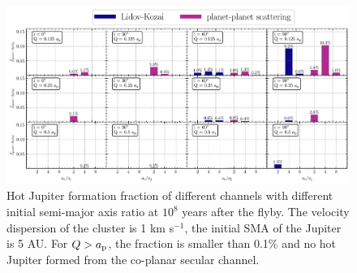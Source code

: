 \documentclass[twocolumn]{aastex63}
\begin{document}
\begin{figure}
    \centering
    \includegraphics[width=\textwidth]{figs/hj-regime-all.pdf}
    \caption{Hot Jupiter formation fraction of different channels with different initial semi-major axis ratio at $10^8$ years after the flyby. The velocity dispersion of the cluster is 1 km s$^{-1}$, the initial SMA of the Jupiter is 5 AU. For $Q>a_{\rm p}$, the fraction is smaller than 0.1\% and no hot Jupiter formed from the co-planar secular channel.}
    \label{fig:hj-regime-s1-r2}
\end{figure}


\end{document}
